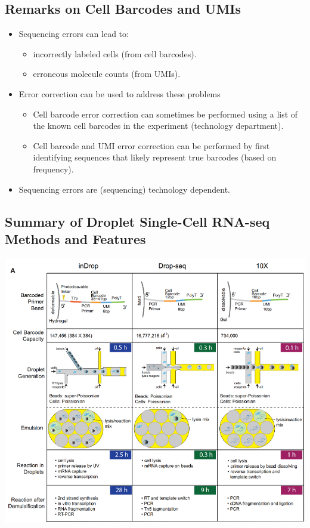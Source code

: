 \documentclass[10pt]{article}
\begin{document}
\subsection*{Remarks on Cell Barcodes and UMIs}
\begin{itemize}
    \item Sequencing errors can lead to:
    \begin{itemize}
        \item incorrectly labeled cells (from cell barcodes).
        \item erroneous molecule counts (from UMIs).
    \end{itemize}
    \item Error correction can be used to address these problems
    \begin{itemize}
        \item Cell barcode error correction can sometimes be performed using a list of the known cell barcodes in the experiment (technology department).
        \item Cell barcode and UMI error correction can be performed by first identifying sequences that likely represent true barcodes (based on frequency).
    \end{itemize}
    \item Sequencing errors are (sequencing) technology dependent.
\end{itemize}

\subsection*{Summary of Droplet Single-Cell RNA-seq Methods and Features}
\begin{center}
    \includegraphics*[scale=0.8]{W7_6.png}
\end{center}
\end{document}
